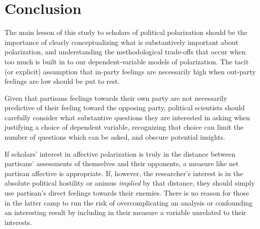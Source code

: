 \documentclass[12pt]{paper}
\begin{document}
\section{Conclusion}
The main lesson of this study to scholars of political polarization should be the importance of clearly conceptualizing what is substantively important about polarization, and understanding the methodological trade-offs that occur when too much is built in to our dependent-variable models of polarization. The tacit (or explicit) assumption that in-party feelings are necessarily high when out-party feelings are low should be put to rest.

Given that partisans feelings towards their own party are not necessarily predictive of their feeling toward the opposing party, political scientists should carefully consider what substantive questions they are interested in asking when justifying a choice of dependent variable, recognizing that choice can limit the number of questions which can be asked, and obscure potential insights.

If scholars' interest in affective polarization is truly in the distance between partisans' assessments of themselves and their opponents, a measure like net partisan affective is appropriate. If, however, the researcher's interest is in the absolute political hostility or animus \textit{implied} by that distance, they should simply use partisan's direct feelings towards their enemies. There is no reason for those in the latter camp to run the risk of overcomplicating an analysis or confounding an interesting result by including in their measure a variable unrelated to their interests.






\thispagestyle{empty}
\clearpage
{}

\end{document}
